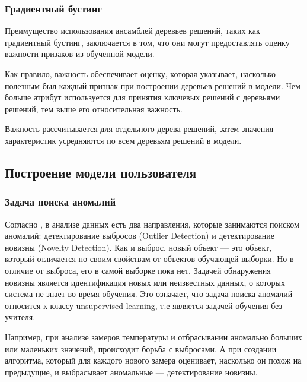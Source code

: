 \documentclass[12pt]{article}
\begin{document}
    \subsubsection{Градиентный бустинг}
    \label{sec:Research:FeatureSpace:GradientBoostingClassifier}

    \par Преимущество использования ансамблей деревьев решений, таких как градиентный бустинг, заключается в том, что они могут предоставлять оценку важности призаков из обученной модели.

    \par Как правило, важность обеспечивает оценку, которая указывает, насколько полезным был каждый признак при построении деревьев решений в модели. Чем больше атрибут используется для принятия ключевых решений с деревьями решений, тем выше его относительная важность.

    \par Важность рассчитывается для отдельного дерева решений, затем значения характеристик усредняются по всем деревьям решений в модели.


    \subsection{Построение модели пользователя}
    \label{sec:Research:Model}
    
    \subsubsection{Задача поиска аномалий}
    \label{sec:Research:Model:Anomaly}

    \par Согласно \cite{Dyakonov, NoveltyDetection}, в анализе данных есть два направления, которые занимаются поиском аномалий: детектирование выбросов (Outlier Detection) и детектирование новизны (Novelty Detection). Как и выброс, новый объект — это объект, который отличается по своим свойствам от объектов обучающей выборки. Но в отличие от выброса, его в самой выборке пока нет. Задачей обнаружения новизны является идентификация новых или неизвестных данных, о которых система не знает во время обучения. Это означает, что задача поиска аномалий относится к классу unsupervised learning, т.е является задачей обучения без учителя.

    \par Например, при анализе замеров температуры и отбрасывании аномально больших или маленьких значений, происходит борьба с выбросами. А при создании алгоритма, который для каждого нового замера оценивает, насколько он похож на предыдущие, и выбрасывает аномальные — детектирование новизны.
\end{document}
